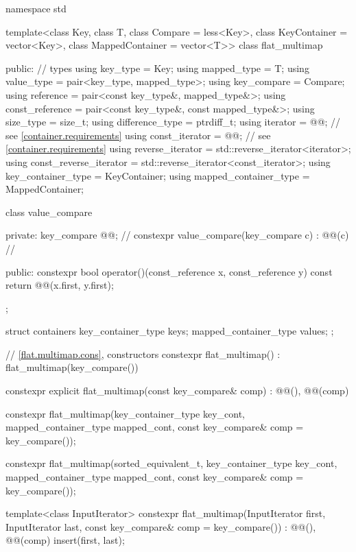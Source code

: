 \begin{codeblock}
namespace std {
  template<class Key, class T, class Compare = less<Key>,
           class KeyContainer = vector<Key>, class MappedContainer = vector<T>>
  class flat_multimap {
  public:
    // types
    using key_type               = Key;
    using mapped_type            = T;
    using value_type             = pair<key_type, mapped_type>;
    using key_compare            = Compare;
    using reference              = pair<const key_type&, mapped_type&>;
    using const_reference        = pair<const key_type&, const mapped_type&>;
    using size_type              = size_t;
    using difference_type        = ptrdiff_t;
    using iterator               = @@;     // see \ref{container.requirements}
    using const_iterator         = @@;     // see \ref{container.requirements}
    using reverse_iterator       = std::reverse_iterator<iterator>;
    using const_reverse_iterator = std::reverse_iterator<const_iterator>;
    using key_container_type     = KeyContainer;
    using mapped_container_type  = MappedContainer;

    class value_compare {
    private:
      key_compare @@;                                         // \expos
      constexpr value_compare(key_compare c) : @@(c) { }      // \expos

    public:
      constexpr bool operator()(const_reference x, const_reference y) const {
        return @@(x.first, y.first);
      }
    };

    struct containers {
      key_container_type keys;
      mapped_container_type values;
    };

    // \ref{flat.multimap.cons}, constructors
    constexpr flat_multimap() : flat_multimap(key_compare()) { }

    constexpr explicit flat_multimap(const key_compare& comp)
      : @@(), @@(comp) { }

    constexpr flat_multimap(key_container_type key_cont, mapped_container_type mapped_cont,
                            const key_compare& comp = key_compare());

    constexpr flat_multimap(sorted_equivalent_t,
                            key_container_type key_cont, mapped_container_type mapped_cont,
                  const key_compare& comp = key_compare());

    template<class InputIterator>
      constexpr flat_multimap(InputIterator first, InputIterator last,
                              const key_compare& comp = key_compare())
        : @@(), @@(comp)
        { insert(first, last); }

}}
\end{codeblock}
